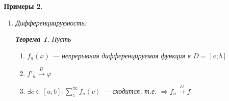 \documentclass[a4paper, 12pt]{article}
\newtheorem{Examples}{Примеры}
\newtheorem{Thm}{Теорема}
\newtheorem{Note}{Замечание}
\begin{document}
\begin{Examples}
\begin{enumerate}
                \begin{Note}
                    Результат теоремы и её следствие можно усилить, 
                    если непрерывность заменить на интегрируемость.
                    (С сохранением условий равномерной сходимости).
                \end{Note}

                \newpage

                \begin{Examples}
                \leavevmode
                    \begin{enumerate}
                        \item 
                            \( \sum^{\infty}_{1} \frac{x ^ {k - 1}}{k},
                            x \in (-1; 1);
                            [-\alpha; \alpha]; 0 < \alpha < 1\)\\
                            \(\sum^{\infty}_{0} x^k\) --- равномерно сходится на
                            \( [-\alpha; \alpha] \)\\

                            \(\sum^{\infty}_{1} \frac{x ^ {k - 1}}{k} =
                            \frac{ln(1 - x)}{x} - ln(1 - x) = 
                            \int^{x}_{a} \frac{dt}{1 - t} = \int^{x}_{a} 
                            (\sum^{\infty}_{k = 0} tk) dt \underset{\text{теорема}}{=}
                            \sum^{\infty}_{k = 0} (\int^{x}_{0} t^kdt) = 
                            \sum^{\infty}_{k = 0} \left.\frac{t ^ {k + 1}}{k + 1}
                            \right|^{x}_{0} =\sum^{\infty}_{k = 0} 
                            \frac{x ^ {k + 1}}{k + 1} = \sum^{\infty}_{k = 1} 
                            \frac{x ^ k}{k} = x \cdot \sum^{\infty}_{k = 1} 
                            \frac{x^{k = 1}}{l}\) непрывна в D
                    \end{enumerate}
                \end{Examples}
             \item 
                Дифференциируемость:\\

                \begin{Thm}
                    Пусть
                    \begin{enumerate}
                        \item 
                            \(f_n(x)\) --- непрерывная дифференцируемая функция в \(D = [a; b]\)
                        \item
                            \( f'_n \xrightarrow{D} \varphi\)
                        \item
                        \(\exists c \in [a; b]: \sum^{\infty}_{1} f_n(c)\) --- сходится, т.е. \( \Rightarrow f_n \xrightarrow{D} f\)
                            

\end{enumerate}
\end{Thm}
\end{enumerate}
\end{Examples}
\end{document}
